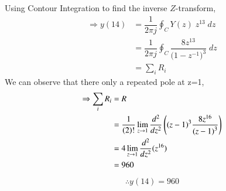 \documentclass[journal,12pt,twocolumn]{IEEEtran}
\theoremstyle{remark}
\begin{document}
 Using Contour Integration to find the inverse $Z$-transform,
\begin{align}
    \Rightarrow y(14)&=\dfrac{1}{2\pi j}\oint_{C}Y(z) \;z^{13} \;dz  \\
    &=\dfrac{1}{2\pi j}\oint_{C}\dfrac{8z^{13}}{({1-z^{-1})}^{3}} \;dz \\
    &=\sum\limits_{i}R_i
\end{align}
We can observe that there only a repeated pole at z=1,
\begin{align}
    \Rightarrow \sum\limits_{i}R_i &= R \\
    &=\dfrac{1}{\left(2\right)!}\lim\limits_{z\to 1}\dfrac{d^{2}}{dz^{2}}\left({(z-1)}^{3}\dfrac{8z^{16}}{{(z-1)}^3}\right)   \\
    &=4\lim\limits_{z\to 1}\dfrac{d^2}{dz^2}(z^{16})   \\
    &=960
\end{align}
\begin{align}
    \therefore \boxed{y(14)=960}
\end{align}

\end{document}
